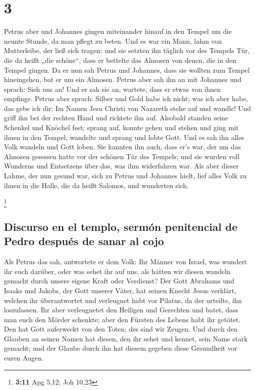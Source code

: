 \hypertarget{section-2}{%
\section{3}\label{section-2}}

 Petrus aber und Johannes gingen miteinander hinauf in den
Tempel um die neunte Stunde, da man pflegt zu beten.  Und
es war ein Mann, lahm von Mutterleibe, der ließ sich tragen; und sie
setzten ihn täglich vor des Tempels Tür, die da heißt „die schöne``,
dass er bettelte das Almosen von denen, die in den Tempel gingen.
 Da er nun sah Petrus und Johannes, dass sie wollten zum
Tempel hineingehen, bat er um ein Almosen.  Petrus aber
sah ihn an mit Johannes und sprach: Sieh uns an!  Und er
sah sie an, wartete, dass er etwas von ihnen empfinge. 
Petrus aber sprach: Silber und Gold habe ich nicht; was ich aber habe,
das gebe ich dir: Im Namen Jesu Christi von Nazareth stehe auf und
wandle!  Und griff ihn bei der rechten Hand und richtete
ihn auf. Alsobald standen seine Schenkel und Knöchel fest;
 sprang auf, konnte gehen und stehen und ging mit ihnen in
den Tempel, wandelte und sprang und lobte Gott.  Und es
sah ihn alles Volk wandeln und Gott loben.  Sie kannten
ihn auch, dass er's war, der um das Almosen gesessen hatte vor der
schönen Tür des Tempels; und sie wurden voll Wunderns und Entsetzens
über das, was ihm widerfahren war.  Als aber dieser
Lahme, der nun gesund war, sich zu Petrus und Johannes hielt, lief alles
Volk zu ihnen in die Halle, die da heißt Salomos, und wunderten sich.

\footnote{\textbf{3:11} Apg 5,12; Joh 10,23}

\hypertarget{discurso-en-el-templo-sermuxf3n-penitencial-de-pedro-despuuxe9s-de-sanar-al-cojo}{%
\subsection{Discurso en el templo, sermón penitencial de Pedro después
de sanar al
cojo}\label{discurso-en-el-templo-sermuxf3n-penitencial-de-pedro-despuuxe9s-de-sanar-al-cojo}}

 Als Petrus das sah, antwortete er dem Volk: Ihr Männer
von Israel, was wundert ihr euch darüber, oder was sehet ihr auf uns,
als hätten wir diesen wandeln gemacht durch unsere eigene Kraft oder
Verdienst?  Der Gott Abrahams und Isaaks und Jakobs, der
Gott unserer Väter, hat seinen Knecht Jesus verklärt, welchen ihr
überantwortet und verleugnet habt vor Pilatus, da der urteilte, ihn
loszulassen.  Ihr aber verleugnetet den Heiligen und
Gerechten und batet, dass man euch den Mörder schenkte; 
aber den Fürsten des Lebens habt ihr getötet. Den hat Gott auferweckt
von den Toten; des sind wir Zeugen.  Und durch den
Glauben an seinen Namen hat diesen, den ihr sehet und kennet, sein Name
stark gemacht; und der Glaube durch ihn hat diesem gegeben diese
Gesundheit vor euren Augen.

